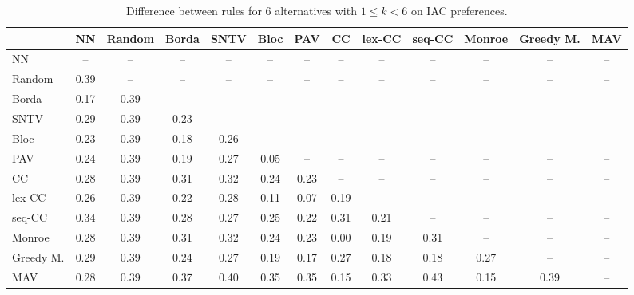 
\begin{table*}[h!]
\centering
\begin{tabular}{lcccccccccccc}
\toprule
 & NN & Random & Borda & SNTV & Bloc & PAV & CC & lex-CC & seq-CC & Monroe & Greedy M. & MAV \\
\midrule
NN & -- & -- & -- & -- & -- & -- & -- & -- & -- & -- & -- & -- \\
Random & 0.39 & -- & -- & -- & -- & -- & -- & -- & -- & -- & -- & -- \\
Borda & 0.17 & 0.39 & -- & -- & -- & -- & -- & -- & -- & -- & -- & -- \\
SNTV & 0.29 & 0.39 & 0.23 & -- & -- & -- & -- & -- & -- & -- & -- & -- \\
Bloc & 0.23 & 0.39 & 0.18 & 0.26 & -- & -- & -- & -- & -- & -- & -- & -- \\
PAV & 0.24 & 0.39 & 0.19 & 0.27 & 0.05 & -- & -- & -- & -- & -- & -- & -- \\
CC & 0.28 & 0.39 & 0.31 & 0.32 & 0.24 & 0.23 & -- & -- & -- & -- & -- & -- \\
lex-CC & 0.26 & 0.39 & 0.22 & 0.28 & 0.11 & 0.07 & 0.19 & -- & -- & -- & -- & -- \\
seq-CC & 0.34 & 0.39 & 0.28 & 0.27 & 0.25 & 0.22 & 0.31 & 0.21 & -- & -- & -- & -- \\
Monroe & 0.28 & 0.39 & 0.31 & 0.32 & 0.24 & 0.23 & 0.00 & 0.19 & 0.31 & -- & -- & -- \\
Greedy M. & 0.29 & 0.39 & 0.24 & 0.27 & 0.19 & 0.17 & 0.27 & 0.18 & 0.18 & 0.27 & -- & -- \\
MAV & 0.28 & 0.39 & 0.37 & 0.40 & 0.35 & 0.35 & 0.15 & 0.33 & 0.43 & 0.15 & 0.39 & -- \\
\bottomrule
\end{tabular}

\caption{Difference between rules for 6 alternatives with $1 \leq k < 6$ on IAC preferences.}
\end{table*}
